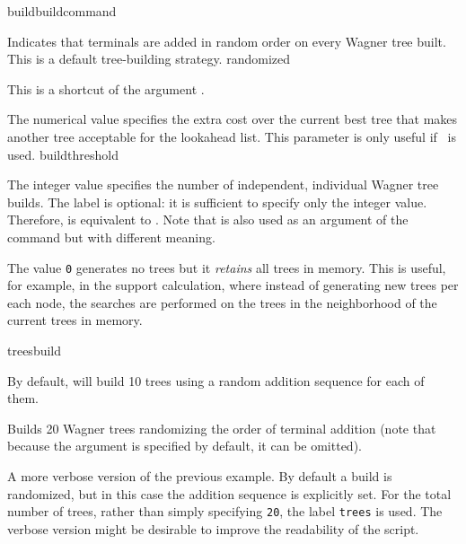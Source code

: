 \begin{command}{build}{buildcommand}
\begin{arguments}
            {Indicates that terminals are added in random order on every Wagner tree built. 
            This is a default tree-building strategy.}
            {randomized}

            {This is a shortcut of the argument .}
            {}

            {The numerical value specifies the extra cost over the current best
            tree that makes another tree acceptable for the lookahead list. This 
            parameter is only useful if~ is used.}
            {buildthreshold}
            
            {The integer value specifies the number of independent, individual
            Wagner tree builds. The label  is optional: it is
            sufficient to specify only the integer value. Therefore,  is
            equivalent to .  Note that   is
            also used as an argument of the command 
            but with different meaning.
            
            The value \texttt{0} generates no trees but it \emph{retains} all trees in memory.
            This is useful, for example, in the  support calculation,
            where instead of generating new trees per each node, the searches are
            performed on the trees in the neighborhood of the current trees in memory.}
            {treesbuild}
            
    \end{arguments}
      
        { By default, \poy will build 10 trees using a random addition sequence
          for each of them.}

    \begin{poyexamples}
            {Builds 20 Wagner trees randomizing the order of terminal
            addition (note that because the argument  
            is specified by default, it can be omitted).}

            {A more verbose version of the previous example. By default a build
            is randomized, but in this case the addition sequence is explicitly
            set. For the total number of trees, rather than simply specifying \texttt{20},
            the label \texttt{trees} is used. The verbose version might be desirable
            to improve the readability of the script.}


\end{poyexamples}
\end{command}
